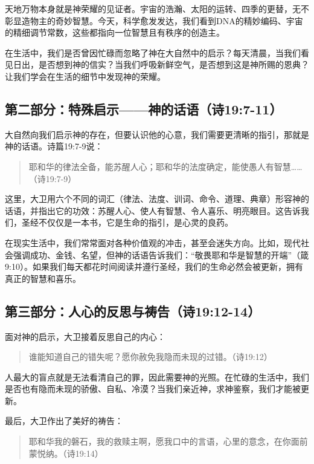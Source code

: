 \documentclass[a4paper, 12pt]{article}
\begin{document}
天地万物本身就是神荣耀的见证者。宇宙的浩瀚、太阳的运转、四季的更替，无不彰显造物主的奇妙智慧。今天，科学愈发发达，我们看到DNA的精妙编码、宇宙的精细调节常数，这些都指向一位智慧且有秩序的创造主。

在生活中，我们是否曾因忙碌而忽略了神在大自然中的启示？每天清晨，当我们看见日出，是否想到神的信实？当我们呼吸新鲜空气，是否想到这是神所赐的恩典？让我们学会在生活的细节中发现神的荣耀。

\subsection*{第二部分：特殊启示——神的话语（诗19:7-11）}

大自然向我们启示神的存在，但要认识他的心意，我们需要更清晰的指引，那就是神的话语。诗篇19:7-9说：

\begin{quote}
耶和华的律法全备，能苏醒人心；耶和华的法度确定，能使愚人有智慧……（诗19:7-9）
\end{quote}

这里，大卫用六个不同的词汇（律法、法度、训词、命令、道理、典章）形容神的话语，并指出它的功效：苏醒人心、使人有智慧、令人喜乐、明亮眼目。这告诉我们，圣经不仅仅是一本书，它是生命的指引，是心灵的良药。

在现实生活中，我们常常面对各种价值观的冲击，甚至会迷失方向。比如，现代社会强调成功、金钱、名望，但神的话语告诉我们：“敬畏耶和华是智慧的开端”（箴9:10）。如果我们每天都花时间阅读并遵行圣经，我们的生命必然会被更新，拥有真正的智慧和喜乐。

\subsection*{第三部分：人心的反思与祷告（诗19:12-14）}

面对神的启示，大卫接着反思自己的内心：

\begin{quote}
谁能知道自己的错失呢？愿你赦免我隐而未现的过错。（诗19:12）
\end{quote}

人最大的盲点就是无法看清自己的罪，因此需要神的光照。在忙碌的生活中，我们是否也有隐而未现的骄傲、自私、冷漠？当我们亲近神，求神鉴察，我们才能被更新。

最后，大卫作出了美好的祷告：

\begin{quote}
耶和华我的磐石，我的救赎主啊，愿我口中的言语，心里的意念，在你面前蒙悦纳。（诗19:14）
\end{quote}
\end{document}
